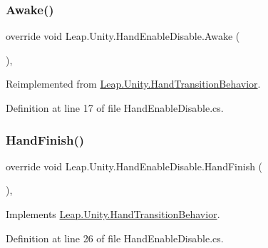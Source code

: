 \subsubsection{\texorpdfstring{Awake()}{Awake()}}
{\footnotesize\ttfamily override void Leap.\+Unity.\+Hand\+Enable\+Disable.\+Awake (\begin{DoxyParamCaption}{ }\end{DoxyParamCaption})\hspace{0.3cm}{\ttfamily [protected]}, {\ttfamily [virtual]}}



Reimplemented from \mbox{\hyperlink{class_leap_1_1_unity_1_1_hand_transition_behavior_ab9676a64c8b2ed72b1dd440c1f690c58}{Leap.\+Unity.\+Hand\+Transition\+Behavior}}.



Definition at line 17 of file Hand\+Enable\+Disable.\+cs.

\mbox{\label{class_leap_1_1_unity_1_1_hand_enable_disable_a7d1c22f4a35fbe6bb4af5e204f8b4d66}} 
\subsubsection{\texorpdfstring{HandFinish()}{HandFinish()}}
{\footnotesize\ttfamily override void Leap.\+Unity.\+Hand\+Enable\+Disable.\+Hand\+Finish (\begin{DoxyParamCaption}{ }\end{DoxyParamCaption})\hspace{0.3cm}{\ttfamily [protected]}, {\ttfamily [virtual]}}



Implements \mbox{\hyperlink{class_leap_1_1_unity_1_1_hand_transition_behavior_ab8668f229af94623ad378f456ae75326}{Leap.\+Unity.\+Hand\+Transition\+Behavior}}.



Definition at line 26 of file Hand\+Enable\+Disable.\+cs.

\mbox{\label{class_leap_1_1_unity_1_1_hand_enable_disable_abb2a2d549b1b674201f32afc08994787}} 
